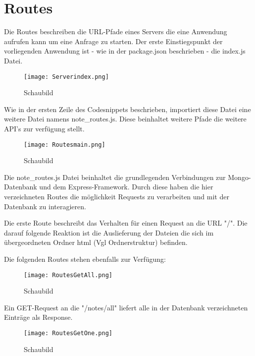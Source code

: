 
\chapter{Routes}
\label{ch:Routes}

Die Routes beschreiben die URL-Pfade eines Servers die eine Anwendung aufrufen kann um eine Anfrage zu starten.
Der erste Einstiegspunkt der vorliegenden Anwendung ist - wie in der package.json beschrieben - die index.js Datei.

\begin{figure}[h]
\texttt{[image: Serverindex.png]}
\vspace{3pt}
\caption{Schaubild\footnotemark}
\label{fig:blueant}
\end{figure}

Wie in der ersten Zeile des Codesnippets beschrieben, importiert diese Datei eine weitere Datei namens note\_routes.js. Diese beinhaltet weitere Pfade die weitere API's zur verfügung stellt.

\begin{figure}[h]
\texttt{[image: Routesmain.png]}
\vspace{3pt}
\caption{Schaubild\footnotemark}
\label{fig:blueant}
\end{figure}


Die note\_routes.js Datei beinhaltet die grundlegenden Verbindungen zur Mongo-Datenbank und dem Express-Framework. Durch diese haben die hier verzeichneten Routes die möglichkeit Requests zu verarbeiten und mit der Datenbank zu interagieren.

Die erste Route beschreibt das Verhalten für einen Request an die URL "/". Die darauf folgende Reaktion ist die Auslieferung der Dateien die sich im übergeordneten Ordner html (Vgl Ordnerstruktur) befinden.

Die folgenden Routes stehen ebenfalls zur Verfügung:

\begin{figure}[h]
\texttt{[image: RoutesGetAll.png]}
\vspace{3pt}
\caption{Schaubild\footnotemark}
\label{fig:blueant}
\end{figure}

Ein GET-Request an die "/notes/all" liefert alle in der Datenbank verzeichneten Einträge als Response.

\begin{figure}[h]
\texttt{[image: RoutesGetOne.png]}
\vspace{3pt}
\caption{Schaubild\footnotemark}
\label{fig:blueant}
\end{figure}

